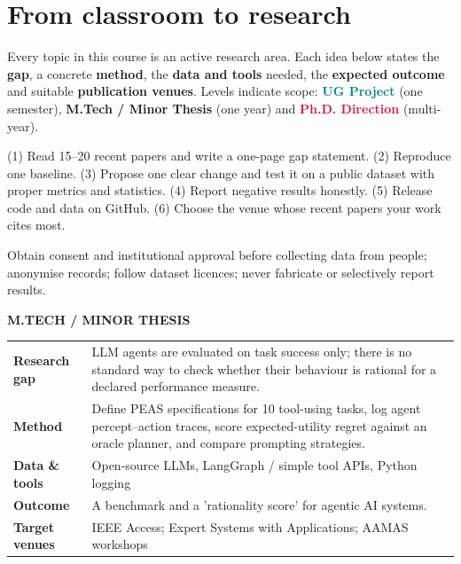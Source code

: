 \documentclass[11pt]{article}
\begin{document}
\section*{From classroom to research}
Every topic in this course is an active research area. Each idea below states the \textbf{gap}, a concrete \textbf{method}, the \textbf{data and tools} needed, the \textbf{expected outcome} and suitable \textbf{publication venues}. Levels indicate scope: \colorbox{teal!15}{\textcolor{teal}{\textbf{UG Project}}} (one semester), \colorbox{navyL!15}{\textcolor{navyL}{\textbf{M.Tech / Minor Thesis}}} (one year) and \colorbox{crimson!15}{\textcolor{crimson}{\textbf{Ph.D. Direction}}} (multi-year).
\begin{keypoint}
(1) Read 15--20 recent papers and write a one-page gap statement. (2) Reproduce one baseline. (3) Propose one clear change and test it on a public dataset with proper metrics and statistics. (4) Report negative results honestly. (5) Release code and data on GitHub. (6) Choose the venue whose recent papers your work cites most.
\end{keypoint}
\begin{keypoint}
Obtain consent and institutional approval before collecting data from people; anonymise records; follow dataset licences; never fabricate or selectively report results.
\end{keypoint}
\newpage
{}
\begin{tcolorbox}[enhanced,breakable,colback=white,colframe=navyL,arc=2mm,boxrule=0.9pt,
 title={\textbf{RI.1\quad Measuring rationality of LLM-based agents with PEAS-grounded benchmarks}},fonttitle=\color{white},colbacktitle=navyL]
\colorbox{navyL!15}{\scriptsize\bfseries\color{navyL} M.TECH / MINOR THESIS}\par\smallskip
\begin{tabularx}{\linewidth}{>{\leavevmode\bfseries\color{navy}}p{3.0cm}X}
Research gap & LLM agents are evaluated on task success only; there is no standard way to check whether their behaviour is rational for a declared performance measure.\\
Method & Define PEAS specifications for 10 tool-using tasks, log agent percept--action traces, score expected-utility regret against an oracle planner, and compare prompting strategies.\\
Data \& tools & Open-source LLMs, LangGraph / simple tool APIs, Python logging\\
Outcome & A benchmark and a 'rationality score' for agentic AI systems.\\
Target venues & IEEE Access; Expert Systems with Applications; AAMAS workshops\\
\end{tabularx}
\end{tcolorbox}
\end{document}
